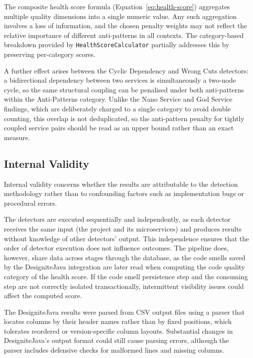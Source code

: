 \par The composite health score formula (Equation~\ref{eq:health-score}) aggregates multiple quality dimensions into a single numeric value. Any such aggregation involves a loss of information, and the chosen penalty weights may not reflect the relative importance of different anti-patterns in all contexts. The category-based breakdown provided by \texttt{HealthScoreCalculator} partially addresses this by preserving per-category scores.

\par A further effect arises between the Cyclic Dependency and Wrong Cuts detectors: a bidirectional dependency between two services is simultaneously a two-node cycle, so the same structural coupling can be penalised under both anti-patterns within the Anti-Patterns category. Unlike the Nano Service and God Service findings, which are deliberately charged to a single category to avoid double counting, this overlap is not deduplicated, so the anti-pattern penalty for tightly coupled service pairs should be read as an upper bound rather than an exact measure.

\subsection{Internal Validity}
\label{subsec:internal-validity}

\par Internal validity concerns whether the results are attributable to the detection methodology rather than to confounding factors such as implementation bugs or procedural errors.

\par The detectors are executed sequentially and independently, as each detector receives the same input (the project and its microservices) and produces results without knowledge of other detectors' output. This independence ensures that the order of detector execution does not influence outcomes. The pipeline does, however, share data across stages through the database, as the code smells saved by the DesigniteJava integration are later read when computing the code quality category of the health score. If the code smell persistence step and the consuming step are not correctly isolated transactionally, intermittent visibility issues could affect the computed score.

\par The DesigniteJava results were parsed from CSV output files using a parser that locates columns by their header names rather than by fixed positions, which tolerates reordered or version-specific column layouts. Substantial changes in DesigniteJava's output format could still cause parsing errors, although the parser includes defensive checks for malformed lines and missing columns.

